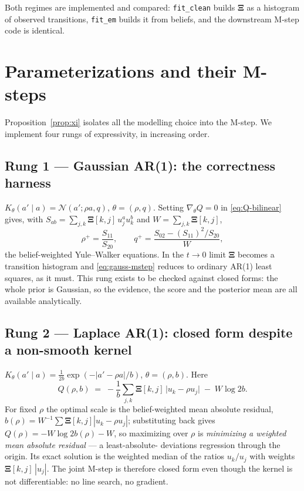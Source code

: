 \documentclass[11pt]{article}
\theoremstyle{remark}
\newcommand{\Normal}{\mathcal{N}}
\newcommand{\Xibf}{\bm{\Xi}}
\begin{document}
Both regimes are implemented and compared: \texttt{fit\_clean} builds $\Xibf$ as
a histogram of observed transitions, \texttt{fit\_em} builds it from beliefs, and
the downstream M-step code is identical.

\section{Parameterizations and their M-steps}
\label{sec:kernels}

Proposition~\ref{prop:xi} isolates all the modelling choice into the M-step. We
implement four rungs of expressivity, in increasing order.

\subsection{Rung 1 --- Gaussian AR(1): the correctness harness}

$K_\theta(a'\mid a) = \Normal(a'; \rho a, q)$, $\theta = (\rho, q)$. Setting
$\nabla_\theta Q = 0$ in \eqref{eq:Q-bilinear} gives, with
$S_{ab} = \sum_{j,k}\Xibf[k,j]\, u_j^{a} u_k^{b}$ and $W = \sum_{j,k}\Xibf[k,j]$,
\begin{equation}
  \rho^{+} = \frac{S_{11}}{S_{20}},
  \qquad
  q^{+} = \frac{S_{02} - (S_{11})^2/S_{20}}{W},
  \label{eq:gauss-mstep}
\end{equation}
the belief-weighted Yule--Walker equations. In the $t\to0$ limit $\Xibf$ becomes
a transition histogram and \eqref{eq:gauss-mstep} reduces to ordinary AR(1)
least squares, as it must. This rung exists to be checked against closed forms:
the whole prior is Gaussian, so the evidence, the score and the posterior mean
are all available analytically.

\subsection{Rung 2 --- Laplace AR(1): closed form despite a non-smooth kernel}

$K_\theta(a'\mid a) = \tfrac{1}{2b}\exp(-|a' - \rho a|/b)$, $\theta = (\rho,b)$.
Here
\begin{equation}
  Q(\rho, b) \;=\; -\frac{1}{b}\sum_{j,k}\Xibf[k,j]\,\bigl|u_k - \rho u_j\bigr|
                  \;-\; W\log 2b .
\end{equation}
For fixed $\rho$ the optimal scale is the belief-weighted mean absolute
residual, $b(\rho) = W^{-1}\sum \Xibf[k,j]|u_k - \rho u_j|$; substituting back
gives $Q(\rho) = -W\log 2b(\rho) - W$, so maximizing over $\rho$ is
\emph{minimizing a weighted mean absolute residual} --- a least-absolute-
deviations regression through the origin. Its exact solution is the weighted
median of the ratios $u_k/u_j$ with weights $\Xibf[k,j]\,|u_j|$. The joint
M-step is therefore closed form even though the kernel is not differentiable:
no line search, no gradient.
\end{document}
